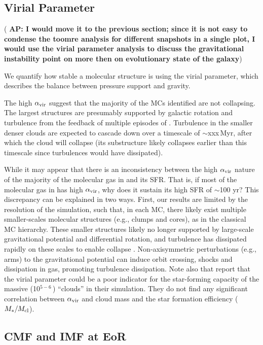 \documentclass[iop]{emulateapj} %
\newcommand{\AP}[1]{({\bf \color{apcolor} AP: #1})}
\begin{document}
\subsection{Virial Parameter}

\AP{I would move it to the previous section; since it is not easy to condense the toomre analysis for different snapshots in a single plot, I would use the virial parameter analysis to discuss the gravitational instability point on more then on evolutionary state of the galaxy}

We quantify how stable a molecular structure is using the virial parameter, which
describes the balance between pressure support and gravity.

The high $\alpha_{\rm vir}$ suggest that the majority of the MCs identified are not collapsing.
The largest structures are presumably supported by galactic rotation and turbulence from the feedback of
multiple episodes of \SF.
Turbulence in the smaller denser clouds are expected to cascade down over a timescale of $\sim$xxx\,Myr, after which the cloud will collapse
(its substructure likely collapses earlier than this timescale since turbulences would have dissipated).

While it may appear that there is an inconsistency between the high $\alpha_{\rm vir}$
nature of the majority of the molecular gas in \flower and its SFR.
That is, if most of the molecular gas in \flower has high $\alpha_{\rm vir}$, why does it sustain its high SFR of $\sim$100\,\Msun\,yr\pmOne?
This discrepancy can be explained in two ways.
First, our results are limited by the resolution of the simulation, such that, in each MC, there
likely exist multiple smaller-scales molecular structures (e.g., clumps and cores),
as in the classical MC hierarchy. These smaller structures likely no longer supported by large-scale gravitational potential and differential rotation,
and turbulence has dissipated rapidly on these scales to enable collapse \citep{Clark04a}.
Non-axisymmetric perturbations (e.g., arms) to the gravitational potential
can induce orbit crossing, shocks and dissipation in gas, promoting turbulence dissipation.
Note also that \citet{Pettitt18a} report that the virial parameter could be a poor indicator
for the star-forming capacity of the massive (10$^{5-6}$\,\Msun) ``clouds'' in their simulation. They
do not find any significant correlation between $\alpha_{\rm vir}$ and cloud mass
and the star formation efficiency ($M_*/M_{\rm cl}$).


\subsection{CMF and IMF at EoR}
\end{document}
